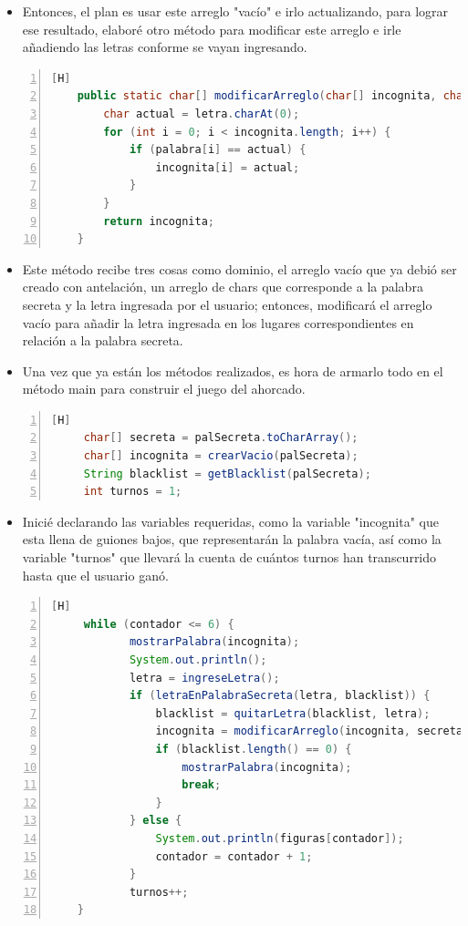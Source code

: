 \documentclass{article}
\begin{document}
	\begin{itemize}	
		\item Entonces, el plan es usar este arreglo "vacío" e irlo actualizando, para lograr ese resultado, elaboré otro método para modificar este arreglo e irle añadiendo las letras conforme se vayan ingresando. 
	\end{itemize}
	\begin{lstlisting}[language=java,caption={Añadiendo las letras a la palabra vacía}, numbers=left][H]
	public static char[] modificarArreglo(char[] incognita, char[] palabra, String letra) {
        char actual = letra.charAt(0);
        for (int i = 0; i < incognita.length; i++) {
            if (palabra[i] == actual) {
                incognita[i] = actual;
            }
        }
        return incognita;
    }
	\end{lstlisting}	
	\begin{itemize}	
		\item Este método recibe tres cosas como dominio, el arreglo vacío que ya debió ser creado con antelación, un arreglo de chars que corresponde a la palabra secreta y la letra ingresada por el usuario; entonces, modificará el arreglo vacío para añadir la letra ingresada en los lugares correspondientes en relación a la palabra secreta.
		\item Una vez que ya están los métodos realizados, es hora de armarlo todo en el método main para construir el juego del ahorcado. 
	\end{itemize}
	\begin{lstlisting}[language=java,caption={Declarando todo lo necesario}, numbers=left][H]
	 char[] secreta = palSecreta.toCharArray();
     char[] incognita = crearVacio(palSecreta);
     String blacklist = getBlacklist(palSecreta);
     int turnos = 1;
	\end{lstlisting}
	\begin{itemize}	
		\item Inicié declarando las variables requeridas, como la variable "incognita" que esta llena de guiones bajos, que representarán la palabra vacía, así como la variable "turnos" que llevará la cuenta de cuántos turnos han transcurrido hasta que el usuario ganó. 
	\end{itemize}
	\begin{lstlisting}[language=java,caption={Código principal}, numbers=left][H]
	 while (contador <= 6) {
            mostrarPalabra(incognita);
            System.out.println();
            letra = ingreseLetra();
            if (letraEnPalabraSecreta(letra, blacklist)) {
                blacklist = quitarLetra(blacklist, letra);
                incognita = modificarArreglo(incognita, secreta, letra);
                if (blacklist.length() == 0) {
                    mostrarPalabra(incognita);
                    break;
                }
            } else {
                System.out.println(figuras[contador]);
                contador = contador + 1;
            }
            turnos++;
    }
	\end{lstlisting}
\end{document}
